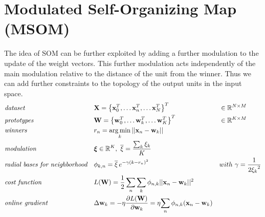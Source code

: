 \documentclass[a4paper]{article}
\DeclareMathOperator*{\argmin}{\operatorname*{arg\,min}} %
\begin{document}
\section*{Modulated Self-Organizing Map (MSOM)}
     The idea of SOM can be further exploited by adding a further modulation to the update of the weight vectors. This further modulation acts independently of the main modulation relative to the distance of the unit from the winner. Thus we can add further constraints to the topology of the output units in the input space.
\begin{align}
	& \emph{dataset} && 
    \mathbf{X} = \left\{\mathbf{x}^T_0, \dots\mathbf{x}^T_n, 
    \dots\mathbf{x}^T_N\right\}^T && 
    \in \mathbb{R}^{N\times M} \nonumber\\
	& \emph{prototypes} && 
    \mathbf{W}=\left\{\mathbf{w}^T_0, \dots\mathbf{w}^T_k, 
    \dots\mathbf{w}^T_K\right\}^T &&
    \in \mathbb{R}^{K \times M} \nonumber\\
 	& \emph{winners} &&  
    r_{n} = \argmin_k  || 
    \mathbf{x}_n - \mathbf{w}_k || && \nonumber\\
    & \emph{modulation} && 
    \boldsymbol{\xi} \in \mathbb{R}^{K}, \ 
    \overline{\xi} = \frac{\sum_k \xi_k}{K} && \nonumber\\
    & \emph{radial bases for neighborhood} && 
    {\phi}_{k,n} = \overline{\xi}\, e^{{-\gamma (k- r_{n})^2}} && 
    with\ \gamma = \frac{1}{2{\xi_k}^2} \nonumber\\
    & \emph{cost function} &&
    L(\mathbf{W}) = \frac{1}{2}\sum_n\sum_k \phi_{n,k} 
    || \mathbf{x}_n - \mathbf{w}_k||^2  &&\nonumber\\
    & \emph{online gradient} && 
    \Delta{\mathbf{w}_{k}} = -\eta\frac{\partial L(\mathbf{W})}
    {\partial\mathbf{w}_{k}} = \eta{\sum_{n}{ \phi_{n,k} 
    (\mathbf{x}_n - \mathbf{w}_{k})}} &&\nonumber
\end{align}
\end{document}
